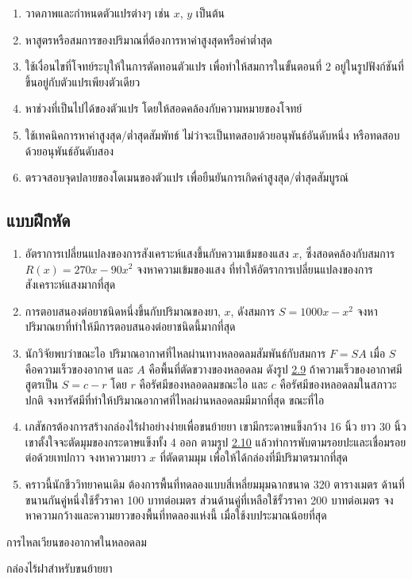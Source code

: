 \documentclass[
]{book}
\theoremstyle{definition}
\theoremstyle{definition}
\theoremstyle{definition}
\theoremstyle{definition}
\theoremstyle{remark}
\begin{document}
\begin{enumerate}
\def\labelenumi{\arabic{enumi}.}
\item
  วาดภาพและกำหนดตัวแปรต่างๆ เช่น \(x\), \(y\) เป็นต้น
\item
  หาสูตรหรือสมการของปริมาณที่ต้องการหาค่าสูงสุดหรือค่าต่ำสุด
\item
  ใช้เงื่อนไขที่โจทย์ระบุให้ในการตัดทอนตัวแปร เพื่อทำให้สมการในขั้นตอนที่ 2
  อยู่ในรูปฟังก์ชันที่ขึ้นอยู่กับตัวแปรเพียงตัวเดียว
\item
  หาช่วงที่เป็นไปได้ของตัวแปร โดยให้สอดคล้องกับความหมายของโจทย์
\item
  ใช้เทคนิคการหาค่าสูงสุด/ต่ำสุดสัมพัทธ์ ไม่ว่าจะเป็นทดสอบด้วยอนุพันธ์อันดับหนึ่ง
  หรือทดสอบด้วยอนุพันธ์อันดับสอง
\item
  ตรวจสอบจุดปลายของโดเมนของตัวแปร เพื่อยืนยันการเกิดค่าสูงสุด/ต่ำสุดสัมบูรณ์
\end{enumerate}

\subsection{แบบฝึกหัด}\label{uxe41uxe1auxe1auxe1duxe01uxe2buxe14-6}

\begin{enumerate}
\def\labelenumi{\arabic{enumi}.}
\item
  อัตราการเปลี่ยนแปลงของการสังเคราะห์แสงขึ้นกับความเข้มของแสง \(x\),
  ซึ่งสอดคล้องกับสมการ \(R(x)=270x-90x^2\) จงหาความเข้มของแสง
  ที่ทำให้อัตราการเปลี่ยนแปลงของการสังเคราะห์แสงมากที่สุด
\item
  การตอบสนองต่อยาชนิดหนึ่งขึ้นกับปริมาณของยา, \(x\), ดังสมการ \(S=1000x-x^2\)
  จงหาปริมาณยาที่ทำให้มีการตอบสนองต่อยาชนิดนี้มากที่สุด
\item
  นักวิจัยพบว่าขณะไอ ปริมาณอากาศที่ไหลผ่านทางหลอดลมสัมพันธ์กับสมการ \(F=SA\) เมื่อ \(S\)
  คือความเร็วของอากาศ และ \(A\) คือพื้นที่ตัดขวางของหลอดลม ดังรูป
  \hyperref[fig-artery]{2.9}
  ถ้าความเร็วของอากาศมีสูตรเป็น \(S=c-r\) โดย \(r\) คือรัศมีของหลอดลมขณะไอ และ \(c\)
  คือรัศมีของหลอดลมในสภาวะปกติ จงหารัศมีที่ทำให้ปริมาณอากาศที่ไหลผ่านหลอดลมมีมากที่สุด
  ขณะที่ไอ
\item
  เภสัชกรต้องการสร้างกล่องไร้ฝาอย่างง่ายเพื่อขนย้ายยา เขามีกระดาษแข็งกว้าง 16 นิ้ว
  ยาว 30 นิ้ว เขาตั้งใจจะตัดมุมของกระดาษแข็งทั้ง 4 ออก ตามรูป
  \hyperref[fig-box-area]{2.10}
  แล้วทำการพับตามรอยปะและเชื่อมรอยต่อด้วยเทปกาว จงหาความยาว \(x\) ที่ตัดตามมุม
  เพื่อให้ได้กล่องที่มีปริมาตรมากที่สุด
\item
  คราวนี้นักชีววิทยาคนเดิม ต้องการพื้นที่ทดลองแบบสี่เหลี่ยมมุมฉากขนาด 320 ตารางเมตร
  ด้านที่ขนานกันคู่หนึ่งใช้รั้วราคา 100 บาทต่อเมตร ส่วนด้านคู่ที่เหลือใช้รั้วราคา 200
  บาทต่อเมตร จงหาความกว้างและความยาวของพื้นที่ทดลองแห่งนี้ เมื่อใช้งบประมาณน้อยที่สุด
\end{enumerate}

การไหลเวียนของอากาศในหลอดลม

กล่องไร้ฝาสำหรับขนย้ายยา

  
\end{document}
